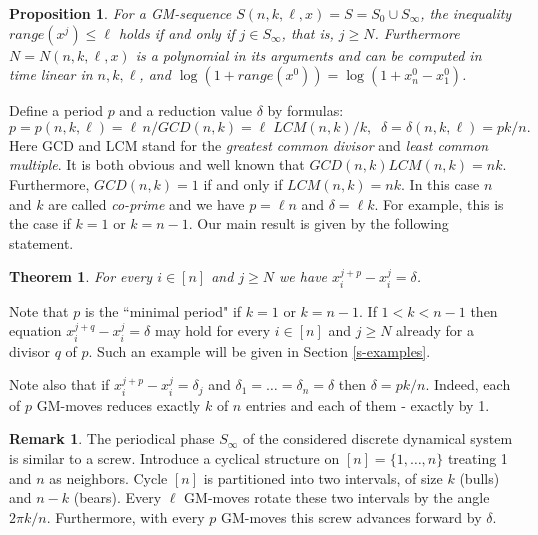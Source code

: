 \documentclass[10pt]{article}
\newtheorem{theorem}{Theorem}
\newtheorem{proposition}{Proposition}
\theoremstyle{definition}
\newtheorem{remark}{Remark}
\begin{document}
\begin{proposition}
\label{p1}
For a GM-sequence $S(n,k,\ell,x) = S = S_0 \cup S_\infty$, 
the inequality $range(x^j) \leq \ell$ holds 
if and only if  $j \in S_\infty$, that is, $j \geq N$.
Furthermore $N = N(n,k,\ell,x)$  
is a polynomial in its arguments and 
can be computed in time linear in $n,k,\ell$, 
and $\log(1 + range(x^0)) = \log(1 + x^0_n - x^0_1)$. 
\end{proposition}

Define a period $p$ and a reduction value  $\delta$  by formulas:
\begin{equation} 
\label{eq-main}
p = p(n,k,\ell) = \ell \, n / GCD(n,k) = \ell \; LCM(n,k)/k, 
\;\; \delta = \delta(n,k,\ell) = pk/n.
\end{equation} 
Here  GCD and LCM stand for 
the {\em greatest common divisor} and {\em least common multiple}. 
It is both obvious and well known that  $GCD(n,k) LCM(n,k) = nk$.
Furthermore, $GCD(n,k) = 1$ if and only if  $LCM(n,k) = nk$.
In this case $n$ and $k$ are called {\em co-prime}  and  
we have  $p = \ell n$ and  $\delta = \ell k$.  
For example, this is the case if  $k = 1$ or $k = n-1$. 
Our main result is given by the following statement. 

\begin{theorem}
\label{t-main} 
For every $i \in [n]$ and $j \geq N$ we have  
 $x_i^{j+p} - x_i^j = \delta$.  
\end{theorem}

Note that  $p$  is the ``minimal period" 
if  $k=1$  or $k=n-1$. 
If  $1 < k < n-1$ then equation  
$x_i^{j+q} - x_i^j = \delta$  may hold      
for every $i \in [n]$ and $j \geq N$  
already for a divisor  $q$  of  $p$. 
Such an example will be given in Section \ref{s-examples}. 

Note also that if $x_i^{j+p} - x_i^j = \delta_j$ 
and $\delta_1 = \ldots = \delta_n = \delta$ 
then $\delta = pk/n$.
Indeed, each of $p$ GM-moves reduces exactly $k$ 
of $n$ entries and each of them - exactly by 1. 

\begin{remark}
The periodical phase $S_\infty$ 
of the considered discrete dynamical system   
is similar to a screw. 
Introduce a cyclical structure on 
$[n] = \{1, \ldots, n\}$ treating 1 and $n$ as neighbors. 
Cycle  $[n]$  is partitioned into 
two intervals, of size $k$ (bulls) and $n-k$ (bears). 
Every $\ell$ GM-moves rotate 
these two intervals by the angle  $2 \pi k / n$.  
Furthermore, with every  $p$  GM-moves 
this screw advances forward by $\delta$.  
\end{remark}
\end{document}
